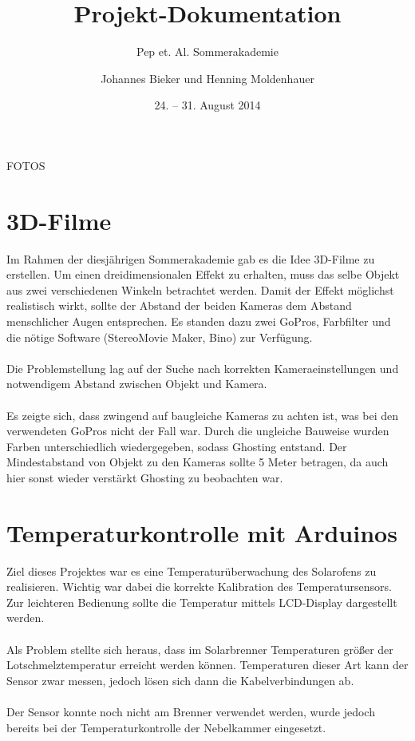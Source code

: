\documentclass[
  bibliography=totoc,     %
  captions=tableheading,  %
  titlepage=firstiscover, %
  twocolumn,
]{scrartcl}
\title{Projekt-Dokumentation}
\subtitle{Pep et. Al. Sommerakademie}
\date{24. -- 31. August 2014}
\author{Johannes Bieker und Henning Moldenhauer}
\begin{document}
\maketitle
\clearpage

FOTOS

\section{3D-Filme}
Im Rahmen der diesjährigen Sommerakademie gab es die Idee 3D-Filme zu erstellen.
Um einen dreidimensionalen Effekt zu erhalten, muss das selbe Objekt aus zwei verschiedenen Winkeln betrachtet werden.
Damit der Effekt möglichst realistisch wirkt, sollte der Abstand der beiden Kameras dem Abstand menschlicher Augen entsprechen.
Es standen dazu zwei GoPros, Farbfilter und die nötige Software (StereoMovie Maker, Bino) zur Verfügung.\\
\\
Die Problemstellung lag auf der Suche nach korrekten Kameraeinstellungen und notwendigem Abstand zwischen Objekt und Kamera.\\
\\
Es zeigte sich, dass zwingend auf baugleiche Kameras zu achten ist, was bei den verwendeten GoPros nicht der Fall war.
Durch die ungleiche Bauweise wurden Farben unterschiedlich wiedergegeben, sodass Ghosting entstand.
Der Mindestabstand von Objekt zu den Kameras sollte 5 Meter betragen, da auch hier sonst wieder verstärkt Ghosting zu beobachten war.

\section{Temperaturkontrolle mit Arduinos}
\label{Temperatursensor}
Ziel dieses Projektes war es eine Temperaturüberwachung des Solarofens zu realisieren.
Wichtig war dabei die korrekte Kalibration des Temperatursensors.
Zur leichteren Bedienung sollte die Temperatur mittels LCD-Display dargestellt werden.\\
\\
Als Problem stellte sich heraus, dass im Solarbrenner Temperaturen größer der Lotschmelztemperatur erreicht werden können.
Temperaturen dieser Art kann der Sensor zwar messen, jedoch lösen sich dann die Kabelverbindungen ab.\\
\\
Der Sensor konnte noch nicht am Brenner verwendet werden, wurde jedoch bereits bei der Temperaturkontrolle der Nebelkammer eingesetzt.
\end{document}
